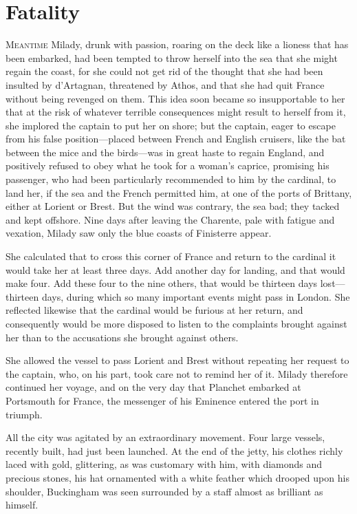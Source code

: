 
\chapter{Fatality}

\lettrine[]{M}{eantime} Milady, drunk with passion, roaring on the deck like a lioness that has been embarked, had been tempted to throw herself into the sea that she might regain the coast, for she could not get rid of the thought that she had been insulted by d'Artagnan, threatened by Athos, and that she had quit France without being revenged on them. This idea soon became so insupportable to her that at the risk of whatever terrible consequences might result to herself from it, she implored the captain to put her on shore; but the captain, eager to escape from his false position---placed between French and English cruisers, like the bat between the mice and the birds---was in great haste to regain England, and positively refused to obey what he took for a woman's caprice, promising his passenger, who had been particularly recommended to him by the cardinal, to land her, if the sea and the French permitted him, at one of the ports of Brittany, either at Lorient or Brest. But the wind was contrary, the sea bad; they tacked and kept offshore. Nine days after leaving the Charente, pale with fatigue and vexation, Milady saw only the blue coasts of Finisterre appear. 

She calculated that to cross this corner of France and return to the cardinal it would take her at least three days. Add another day for landing, and that would make four. Add these four to the nine others, that would be thirteen days lost---thirteen days, during which so many important events might pass in London. She reflected likewise that the cardinal would be furious at her return, and consequently would be more disposed to listen to the complaints brought against her than to the accusations she brought against others. 

She allowed the vessel to pass Lorient and Brest without repeating her request to the captain, who, on his part, took care not to remind her of it. Milady therefore continued her voyage, and on the very day that Planchet embarked at Portsmouth for France, the messenger of his Eminence entered the port in triumph. 

All the city was agitated by an extraordinary movement. Four large vessels, recently built, had just been launched. At the end of the jetty, his clothes richly laced with gold, glittering, as was customary with him, with diamonds and precious stones, his hat ornamented with a white feather which drooped upon his shoulder, Buckingham was seen surrounded by a staff almost as brilliant as himself. 

